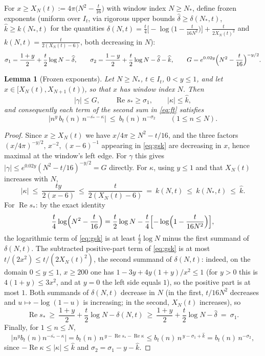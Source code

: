 \documentclass[11pt]{article}
\newtheorem{lemma}[theorem]{Lemma}
\theoremstyle{definition}
\DeclareMathOperator{\Rea}{Re}
\begin{document}
For $x\ge X_N(t):=4\pi\bigl(N^2-\frac t{16}\bigr)$ with window index
$N\ge N_*$, define frozen exponents (uniform over $I_t$, via rigorous
upper bounds $\widehat\delta\ge\delta(N_*,t)$,
$\widehat k\ge k(N_*,t)$ for the quantities
$\delta(N,t)=\frac t4\bigl[-\log\bigl(1-\frac t{16N^2}\bigr)\bigr]
+\frac{t}{2X_N(t)^2}$ and $k(N,t)=\frac{t}{2(X_N(t)-6)}$, both
decreasing in $N$):
\[
\sigma_1=\frac{1+y}{2}+\frac t2\log N-\widehat\delta,
\qquad
\sigma_2=\frac{1-y}{2}+\frac t2\log N-\widehat\delta-\widehat k,
\qquad
G=e^{0.02y}\Bigl(N^2-\frac t{16}\Bigr)^{-y/2}.
\]
\begin{lemma}[Frozen exponents]\label{lem:frozen}
Let $N\ge N_*$, $t\in I_t$, $0<y\le1$, and let
$x\in[X_N(t),X_{N+1}(t))$, so that $x$ has window index $N$. Then
\[
|\gamma|\le G,\qquad
\Rea s_*\ge\sigma_1,\qquad
|\kappa|\le\widehat k,
\]
and consequently each term of the second sum in \eqref{eq:ft}
satisfies
\[
\bigl|n^y\,b_t(n)\,n^{-\overline{s_*}-\kappa}\bigr|
\ \le\ b_t(n)\,n^{-\sigma_2}
\qquad(1\le n\le N).
\]
\end{lemma}

\begin{proof}
Since $x\ge X_N(t)$ we have $x/4\pi\ge N^2-t/16$, and the three
factors $(x/4\pi)^{-y/2}$, $x^{-2}$, $(x-6)^{-1}$ appearing in
\eqref{eq:gsk} are decreasing in $x$, hence maximal at the window's
left edge. For $\gamma$ this gives
$|\gamma|\le e^{0.02y}(N^2-t/16)^{-y/2}=G$ directly. For $\kappa$,
using $y\le1$ and that $X_N(t)$ increases with $N$,
\[
|\kappa|\ \le\ \frac{ty}{2(x-6)}\ \le\ \frac{t}{2(X_N(t)-6)}
\ =\ k(N,t)\ \le\ k(N_*,t)\ \le\ \widehat k .
\]
For $\Rea s_*$: by the exact identity
\[
\frac t4\log\Bigl(N^2-\frac t{16}\Bigr)
=\frac t2\log N
-\frac t4\Bigl[-\log\Bigl(1-\frac t{16N^2}\Bigr)\Bigr],
\]
the logarithmic term of \eqref{eq:gsk} is at least
$\frac t2\log N$ minus the first summand of $\delta(N,t)$. The
subtracted positive-part term of \eqref{eq:gsk} is at most
$t/(2x^2)\le t/(2X_N(t)^2)$, the second summand of $\delta(N,t)$:
indeed, on the domain $0\le y\le1$, $x\ge200$ one has
$1-3y+4y(1+y)/x^2\le1$ (for $y>0$ this is $4(1+y)\le3x^2$, and at
$y=0$ the left side equals $1$), so the positive part is at most
$1$. Both summands of $\delta(N,t)$ decrease in $N$ (in the first,
$t/16N^2$ decreases and $u\mapsto-\log(1-u)$ is increasing; in the
second, $X_N(t)$ increases), so
\[
\Rea s_*\ \ge\ \frac{1+y}2+\frac t2\log N-\delta(N,t)
\ \ge\ \frac{1+y}2+\frac t2\log N-\widehat\delta\ =\ \sigma_1 .
\]
Finally, for $1\le n\le N$,
\[
\bigl|n^y b_t(n)n^{-\overline{s_*}-\kappa}\bigr|
= b_t(n)\,n^{\,y-\Rea s_*-\Rea\kappa}
\le b_t(n)\,n^{\,y-\sigma_1+\widehat k}
= b_t(n)\,n^{-\sigma_2},
\]
since $-\Rea\kappa\le|\kappa|\le\widehat k$ and
$\sigma_2=\sigma_1-y-\widehat k$.
\end{proof}
\end{document}
